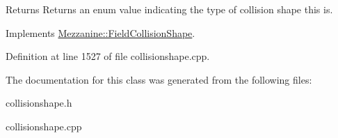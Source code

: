 \begin{DoxyReturn}{Returns}
Returns an enum value indicating the type of collision shape this is. 
\end{DoxyReturn}
 

Implements \hyperlink{classMezzanine_1_1FieldCollisionShape_a85a444fa9bcaca9fec08c3b5697677c9}{Mezzanine::FieldCollisionShape}.



Definition at line 1527 of file collisionshape.cpp.



The documentation for this class was generated from the following files:\begin{DoxyCompactItemize}
\item 
collisionshape.h\item 
collisionshape.cpp\end{DoxyCompactItemize}
